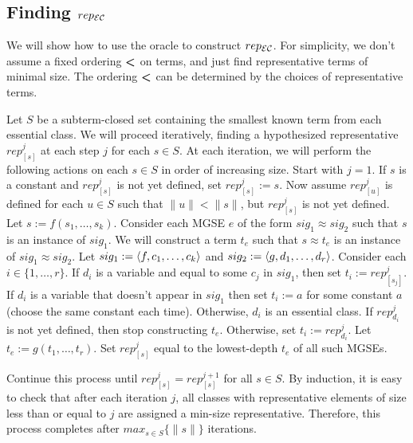 


\subsection{Finding $rep_{\mathcal{E}\mathcal{C}}$} 
We will show how to use the oracle to construct $rep_{\mathcal{E}\mathcal{C}}$.
For simplicity, we don't assume a fixed ordering $\textbf{\textless}$ on terms, and just find representative terms of minimal size.
The ordering $\textbf{\textless}$ can be determined by the choices of representative terms. 

Let $S$ be a subterm-closed set containing the smallest known term from each essential class. 
We will proceed iteratively, finding a hypothesized representative $rep^j_{[s]}$ at each step $j$ for each $s \in S$.
At each iteration, we will perform the following actions on each $s \in S$ in order of increasing size.
Start with $j = 1$. %
If $s$ is a constant and $rep^j_{[s]}$ is not yet defined, set $rep^j_{[s]} := s$.
Now assume $rep^j_{[u]}$ is defined for each $u \in S$ such that $\|u\| < \|s\|$, but $rep^j_{[s]}$ is not yet defined.
Let $s := f(s_1,\dots, s_k)$.
Consider each MGSE  $e$ of the form $sig_1 \approx sig_2$ such that $s$ is an instance of $sig_1$.
We will construct a term $t_e$ such that $s \approx t_e$ is an instance of $sig_1 \approx sig_2$.
Let  $sig_1 := \langle f, c_1,\dots, c_k \rangle$ and $sig_2 := \langle g, d_1,\dots,d_r \rangle$.
Consider each $i \in \{1, \dots, r\}$. 
If $d_i$ is a variable and equal to some $c_j$ in $sig_1$, then set $t_i := rep^j_{[s_j]}$.
If $d_i$ is a variable that doesn't appear in $sig_1$ then set $t_i := a$ for some constant $a$ (choose the same constant each time).
Otherwise, $d_i$ is an essential class.
If $rep^j_{d_i}$ is not yet defined, then stop constructing $t_e$.
Otherwise, set $t_i := rep^j_{d_i}$.
Let $t_e := g(t_1, \dots,t_r)$.
Set $rep^j_{[s]}$ equal to the lowest-depth $t_e$ of all such MGSEs.

Continue this process until $rep^j_{[s]} = rep^{j+1}_{[s]}$ for all $s \in S$. 
By induction, it is easy to check that after each iteration $j$, all classes with representative elements of size less than or equal to $j$ are assigned a min-size representative.
Therefore, this process completes after $max_{s \in S} \{ \|s\| \}$ iterations.



